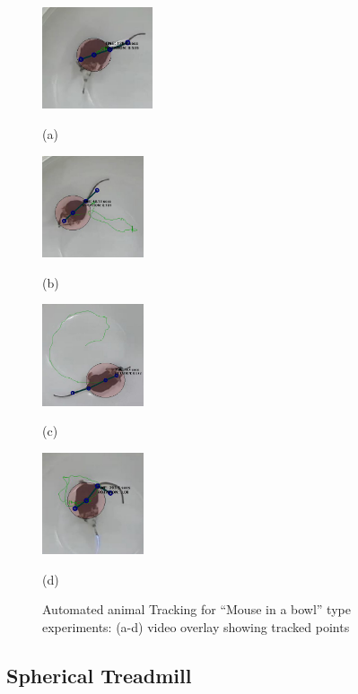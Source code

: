 \begin{figure}[htb]
	\begin{minipage}[t]{0.24\linewidth}\centering
		\includegraphics[height=3cm]{07mousedata1close.jpg}
		\centerline{(a)}
	\end{minipage}
	\hfill
	\begin{minipage}[t]{0.24\linewidth}\centering
		\includegraphics[width=3cm]{06mousedata1.jpg}
		\centerline{(b)}
	\end{minipage}
	\begin{minipage}[t]{0.24\linewidth}\centering
		\includegraphics[width=3cm]{08mousedata2.jpg}
		\centerline{(c)}
	\end{minipage}
	\begin{minipage}[t]{0.24\linewidth}\centering
		\includegraphics[width=3cm]{09mousedata1fiberon1.jpg}
		\centerline{(d)}
	\end{minipage}
	\caption{
		Automated animal Tracking for ``Mouse in a bowl'' type experiments: (a-d) video overlay showing tracked points} \label{fig:Sampling}
\end{figure}

\subsection{Spherical Treadmill}\label{spherical-treadmill} 

